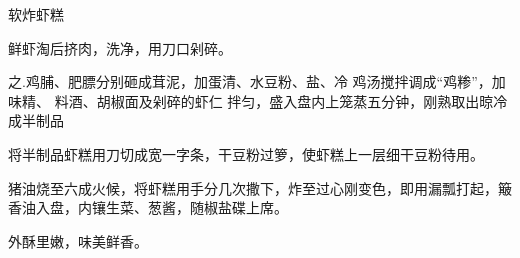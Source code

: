 \begin{recipe}{软炸虾糕}

\ingredients


\preparation

\step 鲜虾淘后挤肉，洗净，用刀口剁碎。

之.鸡脯、肥膘分别砸成茸泥，加蛋清、水豆粉、盐、冷 鸡汤搅拌调成“鸡糁”，加味精、
料酒、胡椒面及剁碎的虾仁 拌匀，盛入盘内上笼蒸五分钟，刚熟取出晾冷成半制品

\step 将半制品虾糕用刀切成宽一字条，干豆粉过箩，使虾糕上一层细干豆粉待用。

\step 猪油烧至六成火候，将虾糕用手分几次撒下，炸至过心刚变色，即用漏瓢打起，簸
香油入盘，内镶生菜、葱酱，随椒盐碟上席。

\features

外酥里嫩，味美鲜香。

\end{recipe}

